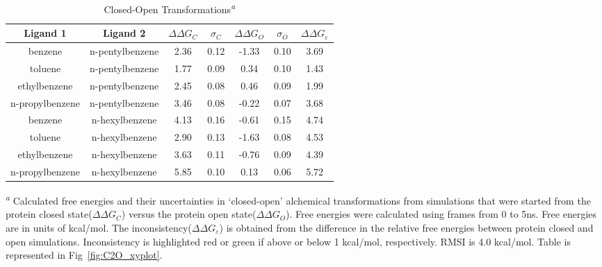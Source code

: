 \begin{table}[!htb]
\centering
\caption{Closed-Open Transformations\textsuperscript{\emph{a}}}
\label{tbl:C-O}
\begin{tabular}{|c|c|c|c|c|c|c|}
\hline
\textbf{Ligand 1}       & \textbf{Ligand 2}    & \boldmath$\Delta\Delta G_{C}$ & \boldmath$\sigma_{C}$ & \boldmath$\Delta\Delta G_{O}$ & \boldmath$\sigma_{O}$ & \boldmath$\Delta\Delta G_{\varepsilon}$ \\ \hline
benzene         & n-pentylbenzene & 2.36       & 0.12  & -1.33  & 0.10  & \cellcolor[HTML]{FFCCC9}3.69 \\ \hline
toluene         & n-pentylbenzene & 1.77       & 0.09  & 0.34   & 0.10  & \cellcolor[HTML]{FFCCC9}1.43 \\ \hline
ethylbenzene    & n-pentylbenzene & 2.45       & 0.08  & 0.46   & 0.09  & \cellcolor[HTML]{FFCCC9}1.99 \\ \hline
n-propylbenzene & n-pentylbenzene & 3.46       & 0.08  & -0.22  & 0.07  & \cellcolor[HTML]{FFCCC9}3.68 \\ \hline
benzene         & n-hexylbenzene  & 4.13       & 0.16  & -0.61  & 0.15  & \cellcolor[HTML]{FFCCC9}4.74 \\ \hline
toluene         & n-hexylbenzene  & 2.90       & 0.13  & -1.63  & 0.08  & \cellcolor[HTML]{FFCCC9}4.53 \\ \hline
ethylbenzene    & n-hexylbenzene  & 3.63       & 0.11  & -0.76  & 0.09  & \cellcolor[HTML]{FFCCC9}4.39 \\ \hline
n-propylbenzene & n-hexylbenzene  & 5.85       & 0.10  & 0.13   & 0.06  & \cellcolor[HTML]{FFCCC9}5.72 \\ \hline
\end{tabular}

\textsuperscript{\emph{a}} Calculated free energies and their uncertainties in `closed-open' alchemical transformations from simulations that were started from the protein closed state(\boldmath$\Delta\Delta G_{C}$) versus the protein open state(\boldmath$\Delta\Delta G_{O}$).
Free energies were calculated using frames from 0 to 5ns.  
Free energies are in units of kcal/mol. 
The inconsistency(\boldmath$\Delta\Delta G_{\varepsilon}$) is obtained from the difference in the relative free energies between protein closed and open simulations. 
Inconsistency is highlighted red or green if above or below 1 kcal/mol, respectively.
RMSI is 4.0 kcal/mol.
Table is represented in Fig~\ref{fig:C2O_xyplot}.
\end{table}

